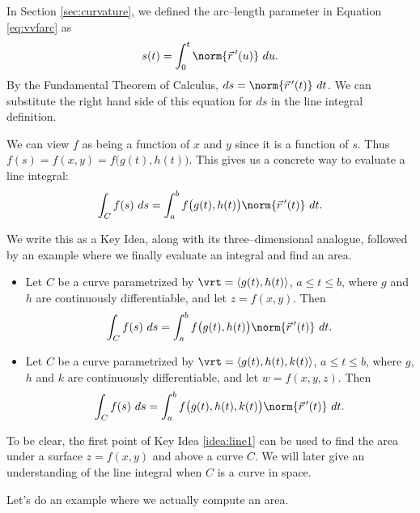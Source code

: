 In Section \ref{sec:curvature}, we defined the arc--length parameter in Equation \ref{eq:vvfarc} as 
$$
s(t) = \int_0^t \norm{\vec r\,'(u)}\ du. 
$$
By the Fundamental Theorem of Calculus, $ds = \norm{\vec r\,'(t)}\ dt$. We can substitute the right hand side of this equation for $ds$ in the line integral definition.

We can view $f$ as being a function of $x$ and $y$ since it is a function of $s$. Thus $f(s) =f(x,y) =f\big(g(t),h(t)\big)$. This gives us a concrete way to evaluate a line integral:
$$\int_C f(s)\ ds = \int_a^bf\big(g(t),h(t)\big)\norm{\vec r\,'(t)}\ dt.$$

We write this as a Key Idea, along with its three--dimensional analogue, followed by an example where we finally evaluate an integral and find an area.

{\begin{itemize}
	\item Let $C$ be a curve parametrized by $\vrt =\langle g(t), h(t)\rangle$, $a\leq t\leq b$, where $g$ and $h$ are continuously differentiable, and let $z=f(x,y)$. Then
	$$\int_Cf(s)\ ds = \int_a^bf\big(g(t),h(t)\big)\norm{\vec r\,'(t)}\ dt.$$
	\item Let $C$ be a curve parametrized by $\vrt =\langle g(t), h(t),k(t)\rangle$, $a\leq t\leq b$, where $g$, $h$ and $k$ are continuously differentiable, and let $w=f(x,y,z)$. Then
	$$\int_Cf(s)\ ds = \int_a^bf\big(g(t),h(t),k(t)\big)\norm{\vec r\,'(t)}\ dt.$$
\end{itemize}
}

To be clear, the first point of Key Idea \ref{idea:line1} can be used to find the area under a surface $z=f(x,y)$ and above a curve $C$. We will later give an understanding of the line integral when $C$ is a curve in space.

Let's do an example where we actually compute an area.\\


